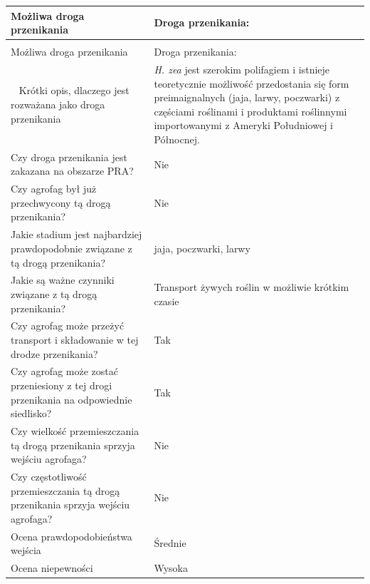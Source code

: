 \documentclass[polish,a4paper]{article}
\begin{document}
\begin{longtabu} to 
\toprule
{}  \textbf{Możliwa droga przenikania} & \textbf{Droga przenikania:}\\
\midrule
\endfirsthead
{}\\
\toprule
Możliwa droga przenikania & Droga przenikania:\\
\midrule
\endhead
\
\endfoot
\bottomrule
\endlastfoot
Krótki opis, dlaczego jest rozważana jako droga przenikania & \textit{H. zea} jest szerokim polifagiem i istnieje teoretycznie możliwość przedostania się form preimaignalnych (jaja, larwy, poczwarki) z częściami roślinami i produktami roślinnymi importowanymi z Ameryki Południowej i Północnej.\\
Czy droga przenikania jest zakazana na obszarze PRA? & Nie\\
Czy agrofag był już przechwycony tą drogą przenikania? & Nie\\
Jakie stadium jest najbardziej prawdopodobnie związane z tą drogą przenikania? & jaja, poczwarki, larwy\\
Jakie są ważne czynniki związane z tą drogą przenikania? & Transport żywych roślin w możliwie krótkim czasie\\
Czy agrofag może przeżyć transport i składowanie w tej drodze przenikania? & Tak\\
Czy agrofag może zostać przeniesiony z tej drogi przenikania na odpowiednie siedlisko? & Tak\\
Czy wielkość przemieszczania tą drogą przenikania sprzyja wejściu agrofaga? & Nie\\
Czy częstotliwość przemieszczania tą drogą przenikania sprzyja wejściu agrofaga? & Nie\\
Ocena prawdopodobieństwa wejścia & Średnie\\
\cmidrule{1-2}
Ocena niepewności & Wysoka\\*
\end{longtabu}
\end{document}

